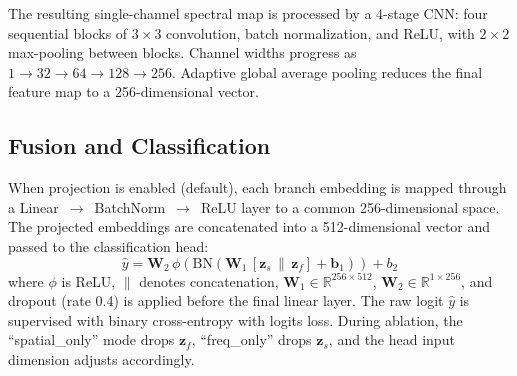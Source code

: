 \documentclass[conference]{IEEEtran}
\begin{document}
The resulting single-channel spectral map is processed by a 4-stage CNN: four sequential blocks of $3{\times}3$ convolution, batch normalization, and ReLU, with $2{\times}2$ max-pooling between blocks. Channel widths progress as $1 \to 32 \to 64 \to 128 \to 256$. Adaptive global average pooling reduces the final feature map to a 256-dimensional vector.

\subsection{Fusion and Classification}

When projection is enabled (default), each branch embedding is mapped through a \mbox{Linear $\to$ BatchNorm $\to$ ReLU} layer to a common 256-dimensional space. The projected embeddings are concatenated into a 512-dimensional vector and passed to the classification head:
\begin{equation}
\label{eq:fusion}
\hat{y} = \mathbf{W}_2\,\phi\!\left(\text{BN}\!\left(\mathbf{W}_1\,[\mathbf{z}_s \,\|\, \mathbf{z}_f] + \mathbf{b}_1\right)\right) + b_2
\end{equation}
where $\phi$ is ReLU, $\|$ denotes concatenation, $\mathbf{W}_1 \in \mathbb{R}^{256 \times 512}$, $\mathbf{W}_2 \in \mathbb{R}^{1 \times 256}$, and dropout (rate 0.4) is applied before the final linear layer. The raw logit $\hat{y}$ is supervised with binary cross-entropy with logits loss. During ablation, the ``spatial\_only'' mode drops $\mathbf{z}_f$, ``freq\_only'' drops $\mathbf{z}_s$, and the head input dimension adjusts accordingly.
\end{document}
